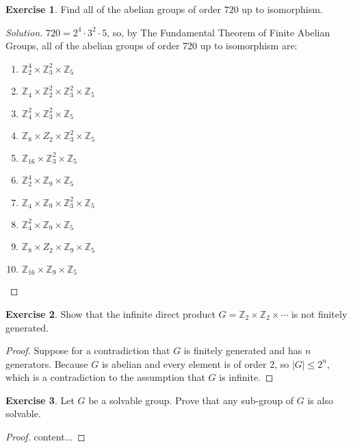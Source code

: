 \documentclass{article}
\theoremstyle{definition}
\newtheorem{theorem}{Exercise}[section]
\theoremstyle{plain}
\newcommand{\Z}{\mathbb{Z}}
\begin{document}
	\setcounter{section}{13}
	\setcounter{theorem}{2}
	\begin{theorem}
		Find all of the abelian groups of order $720$ up to isomorphism. 
	\end{theorem}
	\begin{proof}[Solution]
		$720 = 2^4 \cdot 3^2 \cdot 5$, so, by The Fundamental Theorem of Finite Abelian Groups, all of the abelian groups of order 720 up to isomorphism are: \begin{multicols}{2}
			\begin{enumerate}
				\item $\Z_2^4 \times \Z_3^2 \times \Z_5$
				\item $\Z_4 \times \Z_2^2 \times \Z_3^2 \times \Z_5$
				\item $\Z_4^2 \times \Z_3^2 \times \Z_5$
				\item $\Z_8 \times Z_2 \times \Z_3^2 \times \Z_5$
				\item $\Z_{16} \times \Z_3^2 \times \Z_5$
				\item $\Z_2^4 \times \Z_9 \times \Z_5$
				\item $\Z_4 \times \Z_9 \times \Z_3^2 \times \Z_5$
				\item $\Z_4^2 \times \Z_9 \times \Z_5$
				\item $\Z_8 \times Z_2 \times \Z_9 \times \Z_5$
				\item $\Z_{16} \times \Z_9 \times \Z_5$ \qedhere
			\end{enumerate}
		\end{multicols}
	\end{proof}

	\setcounter{theorem}{4}
	\begin{theorem}
		Show that the infinite direct product $G = \Z_2 \times \Z_2 \times \cdots$ is not finitely generated. 
	\end{theorem}
	\begin{proof}
		Suppose for a contradiction that $G$ is finitely generated and has $n$ generators. Because $G$ is abelian and every element is of order $2$, so $|G|\leq 2^n$, which is a contradiction to the assumption that $G$ is infinite. 
	\end{proof}

	\setcounter{theorem}{13}
	\begin{theorem}
		Let $G$ be a solvable group. Prove that any sub-group of $G$ is also solvable. 
	\end{theorem}
	\begin{proof}
		content...
	\end{proof}
\end{document}
